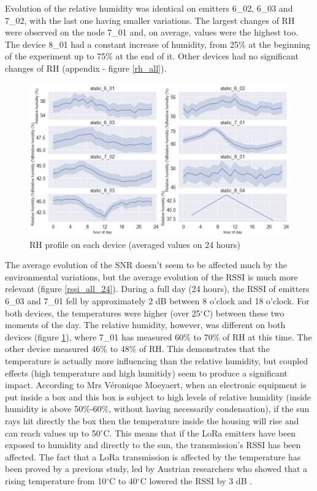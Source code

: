 \documentclass[letterpaper, 10 pt, conference]{ieeeconf}  %
\begin{document}
Evolution of the relative humidity was identical on emitters 6\_02, 6\_03 and 7\_02, with the last one having smaller variations. The largest changes of RH were observed on the node 7\_01 and, on average, values were the highest too. The device 8\_01 had a constant increase of humidity, from 25\% at the beginning of the experiment up to 75\% at the end of it. Other devices had no significant changes of RH (appendix - figure \ref{rh_all}).

\begin{figure}[htbp]
\centering
\includegraphics[scale=0.25]{01_rh_24h_all.png}
\caption{RH profile on each device (averaged values on 24 hours)}
\label{rh_24h_all}
\end{figure}

The average evolution of the SNR doesn't seem to be affected much by the environmental variations, but the average evolution of the RSSI is much more relevant (figure \ref{rssi_all_24}). During a full day (24 hours), the RSSI of emitters 6\_03 and 7\_01 fell by approximately 2 dB between 8 o'clock and 18 o'clock. For both devices, the temperatures were higher (over 25$^\circ$C) between these two moments of the day. The relative humidity, however, was different on both devices (figure \ref{rh_24h_all}), where 7\_01 has measured 60\% to 70\% of RH at this time. The other device measured 46\% to 48\% of RH. This demonstrates that the temperature is actually more influencing than the relative humidity, but coupled effects (high temperature and high humitidy) seem to produce a significant impact. According to Mrs V\'eronique Moeyaert, when an electronic equipment is put inside a box and this box is subject to high levels of relative humidity (inside humidity is above 50\%-60\%, without having necessarily condensation), if the sun rays hit directly the box then the temperature inside the housing will rise and can reach values up to 50$^\circ$C. This means that if the LoRa emitters have been exposed to humidity and directly to the sun, the transmission's RSSI has been affected. The fact that a LoRa transmission is affected by the temperature has been proved by a previous study, led by Austrian researchers who showed that a rising temperature from 10$^\circ$C to 40$^\circ$C lowered the RSSI by 3 dB \cite{c15}.
\end{document}
